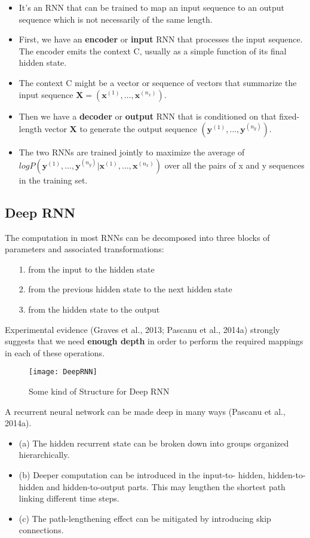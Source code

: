 		\begin{itemize}
			\item It's an RNN that can be trained to map an input sequence to an output sequence which is not necessarily of the same length.
			\item First, we have an \textbf{encoder} or \textbf{input} RNN that processes the input sequence. The encoder emits the context C, usually as a simple function of its final hidden state.
			\item The context C might be a vector or sequence of
			vectors that summarize the input sequence $\mathbf{X} = (\mathbf{x}^{(1)},\ldots,\mathbf{x}^{(n_x)})$.
			\item Then we have a \textbf{decoder} or \textbf{output} RNN that is conditioned on that fixed-length vector $\mathbf{X}$ to generate the output sequence $(\mathbf{y}^{(1)},\ldots,\mathbf{y}^{(n_y)})$.
			\item The two RNNs are trained jointly to maximize the average of \\
			$log P(\mathbf{y}^{(1)},\ldots,\mathbf{y}^{(n_y)}|\mathbf{x}^{(1)},\ldots,\mathbf{x}^{(n_x)})$ over all the pairs of x and y
			sequences in the training set.
		\end{itemize}
	\subsection{Deep RNN}
		The computation in most RNNs can be decomposed into three blocks of parameters and associated transformations:

		\begin{itemize}
			\item[1.] from the input to the hidden state
			\item[2.] from the previous hidden state to the next hidden state
			\item[3.] from the hidden state to the output
		\end{itemize}
		Experimental evidence (Graves et al., 2013; Pascanu et al., 2014a) strongly suggests that we need \textbf{enough depth} in order to perform the required mappings in each of these operations.
		\begin{figure}[H]
			\centering
			\texttt{[image: DeepRNN]}
			\caption{Some kind of Structure for Deep RNN}
		\end{figure}
	A recurrent neural network can be made deep in many ways (Pascanu
	et al., 2014a). 
	\begin{itemize}
		\item (a) The hidden recurrent state can be broken down into groups organized hierarchically. 
		\item (b) Deeper computation can be introduced in the input-to- hidden, hidden-to-hidden and hidden-to-output parts. This may lengthen the shortest path linking different time steps. 
		\item (c) The path-lengthening effect can be mitigated by introducing skip connections.
	\end{itemize}
		
